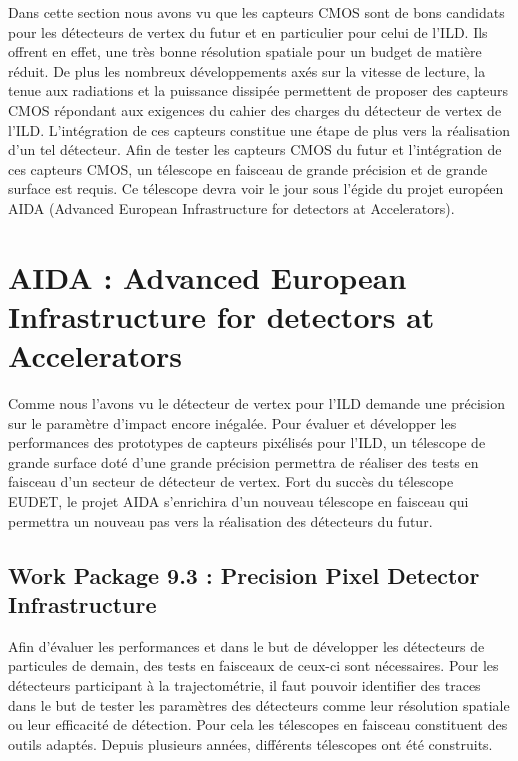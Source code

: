   Dans cette section nous avons vu que les capteurs CMOS sont de bons candidats pour les d\'etecteurs de vertex du futur et en particulier pour celui de l'ILD. Ils offrent en effet, une tr\`es bonne r\'esolution spatiale pour un budget de mati\`ere r\'eduit. De plus les nombreux développements ax\'es sur la vitesse de lecture, la tenue aux radiations et la puissance dissip\'ee permettent de proposer des capteurs CMOS r\'epondant aux exigences du cahier des charges du détecteur de vertex de l'ILD. L'int\'egration de ces capteurs constitue une \'etape de plus vers la r\'ealisation d'un tel d\'etecteur. Afin de tester les capteurs CMOS du futur et l'int\'egration de ces capteurs CMOS, un télescope en faisceau de grande pr\'ecision et de grande surface est requis. Ce télescope devra voir le jour sous l'\'egide du projet europ\'een AIDA (Advanced European Infrastructure for detectors at Accelerators).
  

  
\section{AIDA : Advanced European Infrastructure for detectors at Accelerators}

  Comme nous l'avons vu le d\'etecteur de vertex pour l'ILD demande une pr\'ecision sur le param\`etre d'impact encore in\'egal\'ee. Pour \'evaluer et d\'evelopper les performances des prototypes de capteurs pix\'elis\'es pour l'ILD, un télescope de grande surface dot\'e d'une grande pr\'ecision permettra de r\'ealiser des tests en faisceau d'un secteur de d\'etecteur de vertex. Fort du succ\`es du télescope EUDET, le projet AIDA s'enrichira d'un nouveau télescope en faisceau qui permettra un nouveau pas vers la r\'ealisation des détecteurs du futur.

\subsection{Work Package 9.3 : Precision Pixel Detector Infrastructure}

 Afin d'\'evaluer les performances et dans le but de développer les d\'etecteurs de particules de demain, des tests en faisceaux de ceux-ci sont n\'ecessaires. Pour les d\'etecteurs participant \`a la trajectom\'etrie, il faut pouvoir identifier des traces dans le but de tester les param\`etres des d\'etecteurs comme leur r\'esolution spatiale ou leur efficacit\'e de d\'etection. Pour cela les télescopes en faisceau constituent des outils adapt\'es. Depuis plusieurs ann\'ees, diff\'erents t\'elescopes ont \'et\'e construits.

